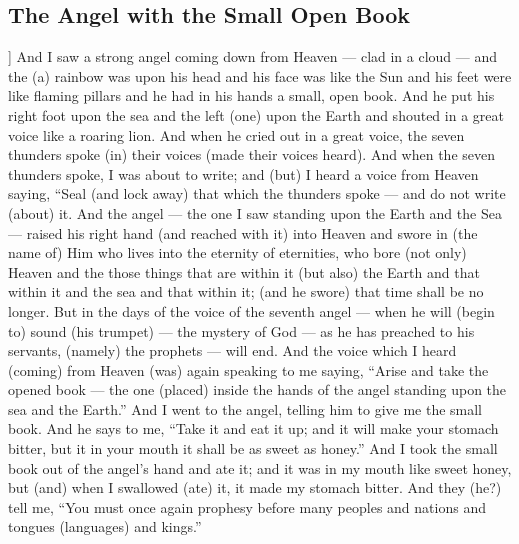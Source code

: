 \begin{pages}
\begin{Leftside}
        			\chapter{The Angel with the Small Open Book}
				]		
		And I saw a strong angel coming down from Heaven — clad in a cloud — and the (a) rainbow was upon his head and his face was like the Sun and his feet were like flaming pillars and he had in his hands a small, open book. And he put his right foot upon the sea and the left (one) upon the Earth and shouted in a great voice like a roaring lion. And when he cried out in a great voice, the seven thunders spoke (in) their voices (made their voices heard). 
		\pend 
		\pstart
		And when the seven thunders spoke, I was about to write; and (but) I heard a voice from Heaven saying, “Seal (and lock away) that which the thunders spoke — and do not write (about) it. And the angel — the one I saw standing upon the Earth and the Sea — raised his right hand (and reached with it) into Heaven and swore in (the name of) Him who lives into the eternity of eternities, who bore (not only) Heaven and the those things that are within it (but also) the Earth and that within it and the sea and that within it; (and he swore) that time shall be no longer. 
		\pend
		\pstart
		But in the days of the voice of the seventh angel — when he will (begin to) sound (his trumpet) — the mystery of God — as he has preached to his servants, (namely) the prophets — will end. And the voice which I heard (coming) from Heaven (was) again speaking to me saying, “Arise and take the opened book — the one (placed) inside the hands of the angel standing upon the sea and the Earth.”
		\pend
		\pstart
		And I went to the angel, telling him to give me the small book. And he says to me, “Take it and eat it up; and it will make your stomach bitter, but it in your mouth it shall be as sweet as honey.” And I took the small book out of the angel’s hand and ate it; and it was in my mouth like sweet honey, but (and) when I swallowed (ate) it, it made my stomach bitter. And they (he?) tell me, “You must once again prophesy before many peoples and nations and tongues (languages) and kings.”
		\pend
        \endnumbering
    \end{Leftside}

\end{pages} 
\Pages

